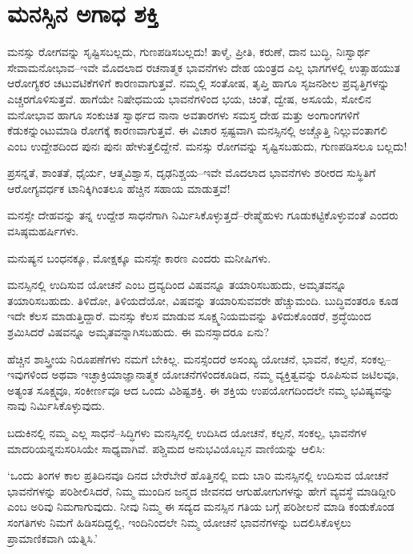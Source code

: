 \section*{ಮನಸ್ಸಿನ ಅಗಾಧ ಶಕ್ತಿ}


ಮನಸ್ಸು ರೋಗವನ್ನು ಸೃಷ್ಟಿಸಬಲ್ಲದು, ಗುಣಪಡಿಸಬಲ್ಲದು! ತಾಳ್ಮೆ, ಪ್ರೀತಿ, ಕರುಣೆ, ದಾನ ಬುದ್ಧಿ, ನಿಃಸ್ವಾರ್ಥ ಸೇವಾಮನೋಭಾವ–ಇವೇ ಮೊದಲಾದ ರಚನಾತ್ಮಕ ಭಾವನೆಗಳು ದೇಹ ಯಂತ್ರದ ಎಲ್ಲ ಭಾಗಗಳಲ್ಲಿ ಉತ್ಸಾಹಯುತ ಆರೋಗ್ಯಕರ ಚಟುವಟಿಕೆಗಳಿಗೆ ಕಾರಣವಾಗುತ್ತವೆ. ನಮ್ಮಲ್ಲಿ ಸಂತೋಷ, ತೃಪ್ತಿ ಹಾಗೂ ಸೃಜನಶೀಲ ಪ್ರವೃತ್ತಿಗಳನ್ನು ಎಚ್ಚರಗೊಳಿಸುತ್ತವೆ. ಹಾಗೆಯೇ ನಿಷೇಧಮಯ ಭಾವನೆಗಳಿಂದ ಭಯ, ಚಿಂತೆ, ದ್ವೇಷ, ಅಸೂಯೆ, ಸೋಲಿನ ಮನೋಭಾವ ಹಾಗೂ ಸಂಕುಚಿತ ಸ್ವಾರ್ಥದ ನಾನಾ ಅವತಾರಗಳು ಸಮಸ್ತ ದೇಹ ಮತ್ತು ಅಂಗಾಂಗಗಳಿಗೆ ಕೆಡುಕನ್ನುಂಟುಮಾಡಿ ರೋಗಕ್ಕೆ ಕಾರಣವಾಗುತ್ತವೆ. ಈ ವಿಚಾರ ಸ್ಪಷ್ಟವಾಗಿ ಮನಸ್ಸಿನಲ್ಲಿ ಅಚ್ಚೊತ್ತಿ ನಿಲ್ಲುವಂತಾಗಲಿ ಎಂಬ ಉದ್ದೇಶದಿಂದ ಪುನಃ ಪುನಃ ಹೇಳುತ್ತಲಿದ್ದೇನೆ. ಮನಸ್ಸು ರೋಗವನ್ನು ಸೃಷ್ಟಿಸಬಹುದು, ಗುಣಪಡಿಸಲೂ ಬಲ್ಲದು!

ಪ್ರಸನ್ನತೆ, ಶಾಂತತೆ, ಧೈರ್ಯ, ಆತ್ಮವಿಶ್ವಾಸ, ದೃಢನಿಶ್ಚಯ–ಇವೇ ಮೊದಲಾದ ಭಾವನೆಗಳು ಶರೀರದ ಸುಸ್ಥಿತಿಗೆ ಆರೋಗ್ಯವರ್ಧಕ ಟಾನಿಕ್ಕಿಗಿಂತಲೂ ಹೆಚ್ಚಿನ ಸಹಾಯ ಮಾಡುತ್ತವೆ!

ಮನಸ್ಸೇ ದೇಹವನ್ನು ತನ್ನ ಉದ್ದೇಶ ಸಾಧನೆಗಾಗಿ ನಿರ್ಮಿಸಿಕೊಳ್ಳುತ್ತದೆ–ರೇಷ್ಮೆಹುಳು ಗೂಡು\-ಕಟ್ಟಿಕೊಳ್ಳುವಂತೆ ಎಂದರು ವಸಿಷ್ಠಮಹರ್ಷಿಗಳು.

ಮನುಷ್ಯನ ಬಂಧನಕ್ಕೂ, ಮೋಕ್ಷಕ್ಕೂ ಮನಸ್ಸೇ ಕಾರಣ ಎಂದರು ಮನೀಷಿಗಳು.

ಮನಸ್ಸಿನಲ್ಲಿ ಉದಿಸುವ ಯೋಚನೆ ಎಂಬ ದ್ರವ್ಯದಿಂದ ವಿಷವನ್ನೂ ತಯಾರಿಸಬಹುದು, ಅಮೃತವನ್ನೂ ತಯಾರಿಸಬಹುದು. ತಿಳಿದೋ, ತಿಳಿಯದೆಯೋ, ವಿಷವನ್ನು ತಯಾರಿಸುವವರೇ ಹೆಚ್ಚುಮಂದಿ. ಬುದ್ಧಿವಂತರೂ ಕೂಡ ಇದೇ ಕೆಲಸ ಮಾಡುತ್ತಿದ್ದಾರೆ. ಮನಸ್ಸು ಕೆಲಸ ಮಾಡುವ ಸೂಕ್ಷ್ಮನಿಯಮವನ್ನು ತಿಳಿದುಕೊಂಡರೆ, ಶ್ರದ್ಧೆಯಿಂದ ಶ್ರಮಿಸಿದರೆ ವಿಷವನ್ನೂ ಅಮೃತವನ್ನಾಗಿಸಬಹುದು. ಈ ಮನಸ್ಸಾದರೂ ಏನು?

ಹೆಚ್ಚಿನ ಶಾಸ್ತ್ರೀಯ ನಿರೂಪಣೆಗಳು ನಮಗೆ ಬೇಕಿಲ್ಲ. ಮನಸ್ಸೆಂದರೆ ಅಸಂಖ್ಯ ಯೋಚನೆ, ಭಾವನೆ, ಕಲ್ಪನೆ, ಸಂಕಲ್ಪ–ಇವುಗಳಿಂದ ಅಥವಾ ಇಚ್ಛಾಕ್ರಿಯಾಜ್ಞಾನಾತ್ಮಕ ಯೋಚನೆಗಳಿಂದ\break ಕೂಡಿದ, ನಮ್ಮ ವ್ಯಕ್ತಿತ್ವವನ್ನು ರೂಪಿಸುವ ಜಟಿಲವೂ, ಅತ್ಯಂತ ಸೂಕ್ಷ್ಮವೂ, ಸಂಕೀರ್ಣವೂ ಆದ ಒಂದು ವಿಶಿಷ್ಟಶಕ್ತಿ. ಈ ಶಕ್ತಿಯ ಉಪಯೋಗದಿಂದಲೇ ನಮ್ಮ ಭವಿಷ್ಯವನ್ನು ನಾವು ನಿರ್ಮಿಸಿ\-ಕೊಳ್ಳುವುದು.

ಬದುಕಿನಲ್ಲಿ ನಮ್ಮ ಎಲ್ಲ ಸಾಧನೆ–ಸಿದ್ಧಿಗಳು ಮನಸ್ಸಿನಲ್ಲಿ ಉದಿಸಿದ ಯೋಚನೆ, ಕಲ್ಪನೆ, ಸಂಕಲ್ಪ, ಭಾವನೆಗಳ ಮಾದರಿಯನ್ನನುಸರಿಸಿಯೇ ಸಾಧ್ಯವಾಗಿವೆ. ಪಶ್ಚಿಮದ ಅನುಭವಿಯೊಬ್ಬನ ವಾಣಿಯನ್ನು ಆಲಿಸಿ:

‘ಒಂದು ತಿಂಗಳ ಕಾಲ ಪ್ರತಿದಿನವೂ ದಿನದ ಬೇರೆಬೇರೆ ಹೊತ್ತಿನಲ್ಲಿ ಐದು ಬಾರಿ ಮನಸ್ಸಿನಲ್ಲಿ ಉದಿಸುವ ಯೋಚನೆ ಭಾವನೆಗಳನ್ನು ಪರಿಶೀಲಿಸಿದರೆ, ನಿಮ್ಮ ಮುಂದಿನ ಜನ್ಮದ ಜೀವನದ ಆಗುಹೋಗುಗಳನ್ನು ಹೇಗೆ ವ್ಯವಸ್ಥೆ ಮಾಡಿದ್ದೀರಿ ಎಂಬ ಅರಿವು ನಿಮಗಾಗುವುದು. ನೀವು ನಿಮ್ಮ ಈ ಸದ್ಯದ ಮನಸ್ಸಿನ ಗತಿಯ ಬಗ್ಗೆ ಪರಿಶೀಲನೆ ಮಾಡಿ ಕಂಡುಕೊಂಡ ಸಂಗತಿಗಳು ನಿಮಗೆ ಹಿಡಿಸದಿದ್ದಲ್ಲಿ, ಇಂದಿನಿಂದಲೇ ನಿಮ್ಮ ಯೋಚನೆ ಭಾವನೆಗಳನ್ನು ಬದಲಿಸಿಕೊಳ್ಳಲು ಪ್ರಾಮಾಣಿಕವಾಗಿ ಯತ್ನಿಸಿ.’

